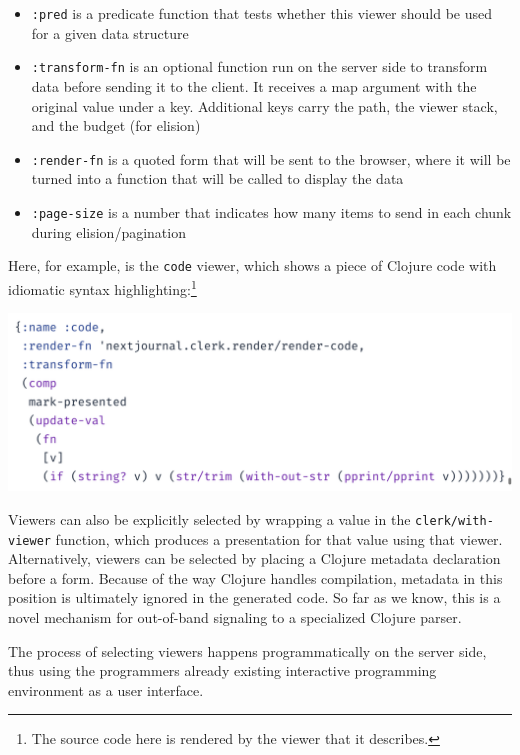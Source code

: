 \documentclass[sigconf,screen,pbalance=true]{acmart}
\newcommand{\passthrough}[1]{#1}
\providecommand{\tightlist}{%
  \setlength{\itemsep}{0pt}\setlength{\parskip}{0pt}}
\begin{document}
\begin{itemize}
\tightlist
\item
  \passthrough{\lstinline!:pred!} is a predicate function that tests whether this viewer should be used for a given data structure
\item
  \passthrough{\lstinline!:transform-fn!} is an optional function run on the server side to transform data before sending it to the client. It receives a map argument with the original value under a key. Additional keys carry the path, the viewer stack, and the budget (for elision)
\item
  \passthrough{\lstinline!:render-fn!} is a quoted form that will be sent to the browser, where it will be turned into a function that will be called to display the data
\item
  \passthrough{\lstinline!:page-size!} is a number that indicates how many items to send in each chunk during elision/pagination
\end{itemize}

Here, for example, is the \passthrough{\lstinline!code!} viewer, which shows a piece of Clojure code with idiomatic syntax highlighting:\footnote{The source code here is rendered by the viewer that it describes.}

\includegraphics{images/anon-expr-5drCPuwp8LirNTWeyr5WSDHWVV2rnC-result.png}

Viewers can also be explicitly selected by wrapping a value in the \passthrough{\lstinline!clerk/with-viewer!} function, which produces a presentation for that value using that viewer. Alternatively, viewers can be selected by placing a Clojure metadata declaration before a form. Because of the way Clojure handles compilation, metadata in this position is ultimately ignored in the generated code. So far as we know, this is a novel mechanism for out-of-band signaling to a specialized Clojure parser.

The process of selecting viewers happens programmatically on the server side, thus using the programmer\textquotesingle s already existing interactive programming environment as a user interface.
\end{document}
